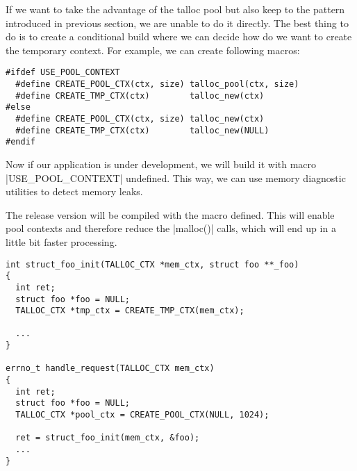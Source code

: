 If we want to take the advantage of the talloc pool but also keep to the
pattern introduced in previous section, we are unable to do it directly. The
best thing to do is to create a conditional build where we can decide how do we
want to create the temporary context. For example, we can create following
macros:

\begin{lstlisting}[caption={Conditional temporary context
macros},label=lst:tmp-ctx-4]
#ifdef USE_POOL_CONTEXT
  #define CREATE_POOL_CTX(ctx, size) talloc_pool(ctx, size)
  #define CREATE_TMP_CTX(ctx)        talloc_new(ctx)
#else
  #define CREATE_POOL_CTX(ctx, size) talloc_new(ctx)
  #define CREATE_TMP_CTX(ctx)        talloc_new(NULL)
#endif
\end{lstlisting}

Now if our application is under development, we will build it with macro
|USE_POOL_CONTEXT| undefined. This way, we  can use memory diagnostic
utilities to detect memory leaks.

The release version will be compiled with the macro defined. This will  enable
pool contexts and therefore reduce the |malloc()| calls, which will end up in a
little bit faster processing.

\begin{lstlisting}[caption={Conditional temporary context},label=lst:tmp-ctx-5]
int struct_foo_init(TALLOC_CTX *mem_ctx, struct foo **_foo)
{
  int ret;
  struct foo *foo = NULL;
  TALLOC_CTX *tmp_ctx = CREATE_TMP_CTX(mem_ctx);

  ...
}

errno_t handle_request(TALLOC_CTX mem_ctx)
{
  int ret;
  struct foo *foo = NULL;
  TALLOC_CTX *pool_ctx = CREATE_POOL_CTX(NULL, 1024);
  
  ret = struct_foo_init(mem_ctx, &foo);
  ...
}
\end{lstlisting}